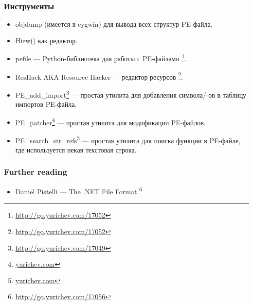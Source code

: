 \subsubsection{Инструменты}

\begin{itemize}
\item
{}
objdump (имеется в cygwin) для вывода всех структур PE-файла.

\item
{}
Hiew() как редактор.

\item pefile --- Python-библиотека для работы с PE-файлами
\footnote{\url{http://go.yurichev.com/17052}}.

\item
\label{ResHack}
ResHack \acs{AKA} Resource Hacker --- редактор ресурсов
\footnote{\url{http://go.yurichev.com/17052}}.

\item PE\_add\_import\footnote{\url{http://go.yurichev.com/17049}} --- простая утилита для добавления символа/-ов в таблицу импортов PE-файла.

\item PE\_patcher\footnote{\href{http://go.yurichev.com/17054}{yurichev.com}} --- простая утилита для модификации PE-файлов.

\item PE\_search\_str\_refs\footnote{\href{http://go.yurichev.com/17055}{yurichev.com}} --- простая утилита для поиска функции в PE-файле, где используется некая текстовая строка.
\end{itemize}

\subsubsection{Further reading}

\begin{itemize}
\item Daniel Pistelli --- The .NET File Format \footnote{\url{http://go.yurichev.com/17056}}
\end{itemize}

